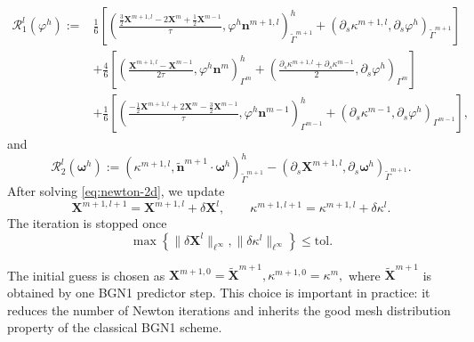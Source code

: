 \documentclass[smallextended]{svjour3}
\numberwithin{equation}{section}
\begin{document}
	\begin{align}
		\mathcal{R}_1^{l}(\varphi^h)
		:={}&
		\frac16\left[
		\left(
		\frac{\frac32\mathbf{X}^{m+1,l}-2\mathbf{X}^{m}+\frac12\mathbf{X}^{m-1}}{\tau},
		\varphi^h\mathbf{n}^{m+1,l}
		\right)^h_{\widetilde{\Gamma}^{m+1}}
		+
		\left(
		\partial_s\kappa^{m+1,l},
		\partial_s\varphi^h
		\right)_{\widetilde{\Gamma}^{m+1}}
		\right]
		\nonumber\\
		&+
		\frac46\left[
		\left(
		\frac{\mathbf{X}^{m+1,l}-\mathbf{X}^{m-1}}{2\tau},
		\varphi^h\mathbf{n}^{m}
		\right)^h_{\Gamma^{m}}
		+
		\left(
		\frac{\partial_s\kappa^{m+1,l}+\partial_s\kappa^{m-1}}{2},
		\partial_s\varphi^h
		\right)_{\Gamma^{m}}
		\right]
		\nonumber\\
		&+
		\frac16\left[
		\left(
		\frac{-\frac12\mathbf{X}^{m+1,l}+2\mathbf{X}^{m}-\frac32\mathbf{X}^{m-1}}{\tau},
		\varphi^h\mathbf{n}^{m-1}
		\right)^h_{\Gamma^{m-1}}
		+
		\left(
		\partial_s\kappa^{m-1},
		\partial_s\varphi^h
		\right)_{\Gamma^{m-1}}
		\right],
		\label{eq:R1-2d}
	\end{align}
	and
	\begin{equation}
		\mathcal{R}_2^{l}(\boldsymbol{\omega}^h)
		:=
		\left(
		\kappa^{m+1,l},
		\widetilde{\mathbf{n}}^{m+1}\cdot\boldsymbol{\omega}^h
		\right)^h_{\widetilde{\Gamma}^{m+1}}
		-
		\left(
		\partial_s\mathbf{X}^{m+1,l},
		\partial_s\boldsymbol{\omega}^h
		\right)_{\widetilde{\Gamma}^{m+1}}.
		\label{eq:R2-2d}
	\end{equation}
	After solving \eqref{eq:newton-2d}, we update
	\[
	\mathbf{X}^{m+1,l+1}
	=
	\mathbf{X}^{m+1,l}+\delta\mathbf{X}^{l},
	\qquad
	\kappa^{m+1,l+1}
	=
	\kappa^{m+1,l}+\delta\kappa^{l}.
	\]
	The iteration is stopped once
	\[
	\max\left\{
	\|\delta\mathbf{X}^{l}\|_{\ell^\infty},
	\|\delta\kappa^{l}\|_{\ell^\infty}
	\right\}
	\le \mathrm{tol}.
	\]
	
	The initial guess is chosen as
	$
	\mathbf{X}^{m+1,0}=\widetilde{\mathbf{X}}^{m+1},
	\kappa^{m+1,0}=\kappa^m,
	$
	where $\widetilde{\mathbf{X}}^{m+1}$ is obtained by one BGN1 predictor step. This choice is important in practice: it reduces the number of Newton iterations and inherits the good mesh distribution property of the classical BGN1 scheme.
	
	
\end{document}
